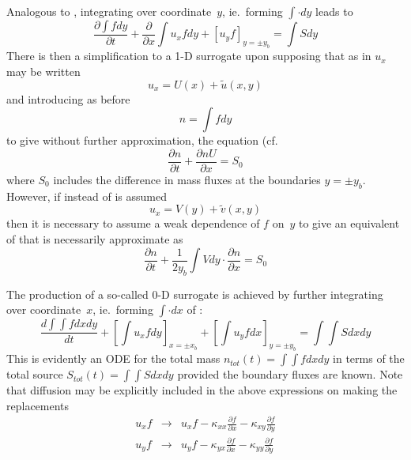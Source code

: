 Analogous to , integrating  over coordinate~$y$,
ie.\ forming $\int \cdot dy$ leads to
\begin{equation}\label{eq:masscon1d}
 \frac{\partial \int f dy}{\partial t}  +  \frac{\partial}{\partial x} \int u_x f dy+  [  u_y f ]_{y=\pm y_b} = \int S dy
\end{equation}
There is then a simplification to a 1-D surrogate upon supposing
that as in  $u_x$ may be written 
\begin{equation}\label{eq:usplit2}
u_x = U(x) + \tilde{u} (x,y)
\end{equation}
and introducing as before
\begin{equation}
n = \int f dy
\end{equation}
to give without further approximation, the equation (cf.\ 
\begin{equation}\label{eq:massconplus}
 \frac{\partial n}{\partial t}  +  \frac{\partial  nU}{\partial x}  = S_0
\end{equation}
where $S_0$ includes the difference in mass fluxes at the boundaries $y=\pm y_b$.
However, if instead of  is assumed
\begin{equation}\label{eq:vsplit2}
u_x = V(y) + \tilde{v} (x,y)
\end{equation}
then it is necessary to assume a weak dependence of $f$ on~$y$ to give an equivalent of
 that is necessarily approximate as
\begin{equation}\label{eq:massconplvs}
 \frac{\partial n}{\partial t}  +   \frac{1}{2y_b} \int V dy \cdot \frac{\partial  n}{\partial x} = S_0
\end{equation}

The production of a so-called 0-D surrogate is achieved by further integrating over
coordinate~$x$, ie.\ forming $\int \cdot dx$ of :
\begin{equation}\label{eq:masscon0d}
 \frac{d \int\int f dx dy}{dt}  + \left[ \int u_x f dy \right]_{x=\pm x_b} +  \left[ \int  u_y f dx \right]_{y=\pm y_b} = \int \int S dx dy
\end{equation}
This is evidently an ODE for the total mass $n_{tot}(t) =\int\int f dx dy$ in terms of the
total source $S_{tot}(t) = \int \int S dx dy$ provided the boundary fluxes are known.
Note that diffusion may be explicitly included in the above expressions 
on making the replacements
\begin{eqnarray}\label{eq:addif}
u_x f &\longrightarrow&  u_x f 
- \kappa_{xx} \frac{\partial f}{\partial x} - \kappa_{xy} \frac{\partial f}{\partial y}\\
u_y f &\longrightarrow&  u_y f 
- \kappa_{yx} \frac{\partial f}{\partial x} - \kappa_{yy} \frac{\partial f}{\partial y}
\end{eqnarray}


